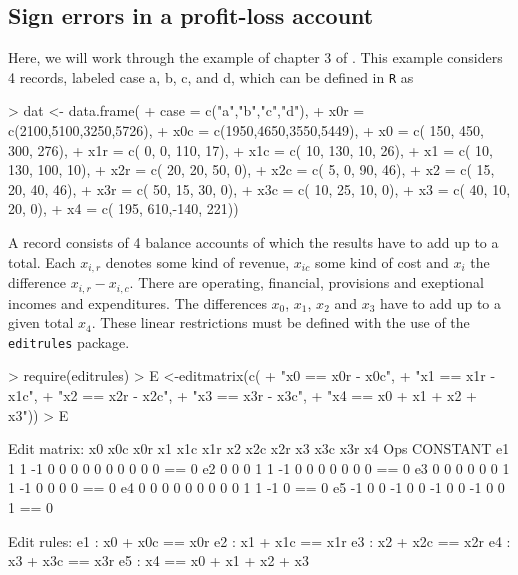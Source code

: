 \documentclass[11pt, fleqn, a4paper]{article}
\begin{document}
\subsection{Sign errors in a profit-loss account}
\label{exScholtusCorrectSigns}
Here, we will work through the example of chapter $3$ of \citet{scholtus:2008}.
This example considers 4 records, labeled case a, b, c, and d, which can be
defined in {\tt R} as
\begin{Schunk}
\begin{Sinput}
> dat <- data.frame(
+    case = c("a","b","c","d"),
+    x0r = c(2100,5100,3250,5726),
+    x0c = c(1950,4650,3550,5449),
+    x0  = c( 150, 450, 300, 276),
+    x1r = c(   0,   0, 110,  17),
+    x1c = c(  10, 130,  10,  26),
+    x1  = c(  10, 130, 100,  10),
+    x2r = c(  20,  20,  50,   0),
+    x2c = c(   5,   0,  90,  46),
+    x2  = c(  15,  20,  40,  46),
+    x3r = c(  50,  15,  30,   0),
+    x3c = c(  10,  25,  10,   0),
+    x3  = c(  40,  10,  20,   0),
+    x4  = c( 195, 610,-140, 221))
\end{Sinput}
\end{Schunk}
A record consists of 4 balance accounts of which the results have to add up to
a total.  Each $x_{i,r}$ denotes some kind of revenue, $x_{ic}$ some kind of
cost and $x_i$ the difference $x_{i,r}-x_{i,c}$. There are operating,
financial, provisions and exeptional incomes and expenditures. The differences
$x_0$, $x_1$, $x_2$ and $x_3$ have to add up to a given total $x_4$.  These
linear restrictions must be defined with the use of the {\tt editrules} package.
\begin{Schunk}
\begin{Sinput}
> require(editrules)
> E <-editmatrix(c(
+     "x0 == x0r - x0c",
+     "x1 == x1r - x1c",
+     "x2 == x2r - x2c",
+     "x3 == x3r - x3c",
+     "x4 == x0 + x1 + x2 + x3"))
> E
\end{Sinput}
\begin{Soutput}
Edit matrix:
   x0 x0c x0r x1 x1c x1r x2 x2c x2r x3 x3c x3r x4 Ops CONSTANT
e1  1   1  -1  0   0   0  0   0   0  0   0   0  0  ==        0
e2  0   0   0  1   1  -1  0   0   0  0   0   0  0  ==        0
e3  0   0   0  0   0   0  1   1  -1  0   0   0  0  ==        0
e4  0   0   0  0   0   0  0   0   0  1   1  -1  0  ==        0
e5 -1   0   0 -1   0   0 -1   0   0 -1   0   0  1  ==        0

Edit rules:
e1 : x0 + x0c == x0r 
e2 : x1 + x1c == x1r 
e3 : x2 + x2c == x2r 
e4 : x3 + x3c == x3r 
e5 : x4 == x0 + x1 + x2 + x3  
\end{Soutput}
\end{Schunk}
\end{document}
